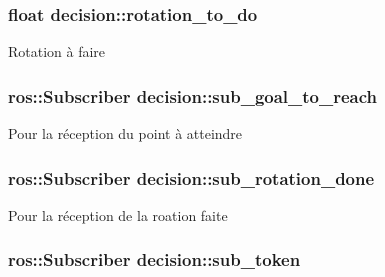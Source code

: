 \subsubsection[{\texorpdfstring{rotation\+\_\+to\+\_\+do}{rotation_to_do}}]{\setlength{\rightskip}{0pt plus 5cm}float decision\+::rotation\+\_\+to\+\_\+do\hspace{0.3cm}{\ttfamily [private]}}\hypertarget{classdecision_ab8f9703ded89c8fa9d3be694934188c7}{}\label{classdecision_ab8f9703ded89c8fa9d3be694934188c7}
Rotation à faire 
\subsubsection[{\texorpdfstring{sub\+\_\+goal\+\_\+to\+\_\+reach}{sub_goal_to_reach}}]{\setlength{\rightskip}{0pt plus 5cm}ros\+::\+Subscriber decision\+::sub\+\_\+goal\+\_\+to\+\_\+reach\hspace{0.3cm}{\ttfamily [private]}}\hypertarget{classdecision_a088684a934191a0ad40f3e61ad3691ed}{}\label{classdecision_a088684a934191a0ad40f3e61ad3691ed}
Pour la réception du point à atteindre 
\subsubsection[{\texorpdfstring{sub\+\_\+rotation\+\_\+done}{sub_rotation_done}}]{\setlength{\rightskip}{0pt plus 5cm}ros\+::\+Subscriber decision\+::sub\+\_\+rotation\+\_\+done\hspace{0.3cm}{\ttfamily [private]}}\hypertarget{classdecision_a429cdcb43bc24e661fd361c77f66c82c}{}\label{classdecision_a429cdcb43bc24e661fd361c77f66c82c}
Pour la réception de la roation faite 
\subsubsection[{\texorpdfstring{sub\+\_\+token}{sub_token}}]{\setlength{\rightskip}{0pt plus 5cm}ros\+::\+Subscriber decision\+::sub\+\_\+token\hspace{0.3cm}{\ttfamily [private]}}\hypertarget{classdecision_a02e3400afdb00b874d96f1f49b9bb929}{}\label{classdecision_a02e3400afdb00b874d96f1f49b9bb929}
